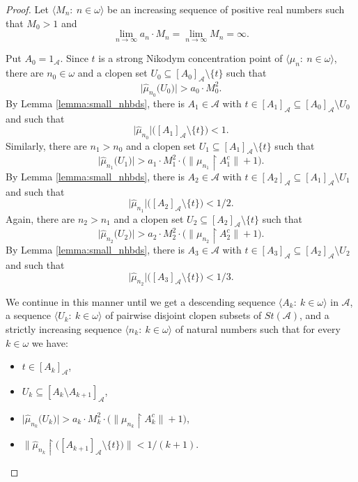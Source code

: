 \documentclass[10pt,a4paper]{amsart}
\newcommand{\N}{\mathbb{N}}
\newcommand{\aA}{\mathcal{A}}
\newcommand{\clopen}[1]{\left[#1\right]}
\newcommand{\io}{\in\omega}%
\newcommand{\rstr}{\restriction}
\newcommand{\seqk}[1]{\big\langle#1\colon\ k\io\big\rangle}
\newcommand{\seqn}[1]{\big\langle#1\colon\ n\io\big\rangle}
\newcommand{\sm}{\setminus}
\newcommand{\sub}{\subseteq}
\newcommand{\wh}{\widehat}
\begin{document}
\begin{proof}
Let $\seqn{M_n}$ be an increasing sequence of positive real numbers such that $M_0>1$ and
\[\tag{$*$}\lim_{n\to\infty}a_n\cdot M_n=\lim_{n\to\infty}M_n=\infty.\]

Put $A_0=1_\aA$. Since $t$ is a strong Nikodym concentration point of $\seqn{\mu_n}$, there are $n_0\io$ and a clopen set $U_0\sub\clopen{A_0}_\aA\sm\{t\}$ such that
\[\big|\wh{\mu}_{n_0}\big(U_0\big)\big|>a_0\cdot M_0^2.\]
By Lemma \ref{lemma:small_nhbds}, there is $A_1\in\aA$ with $t\in\clopen{A_1}_\aA\sub\clopen{A_0}_\aA\sm U_0$ and such that
\[\big|\wh{\mu}_{n_0}\big|\big(\clopen{A_1}_\aA\sm\{t\}\big)<1.\]
Similarly, there are $n_1>n_0$ and a clopen set $U_1\sub\clopen{A_1}_\aA\sm\{t\}$ such that
\[\big|\wh{\mu}_{n_1}\big(U_1\big)\big|>a_1\cdot M_1^2\cdot\Big(\big\|\mu_{n_1}\rstr A_1^c\big\|+1\Big).\]
By Lemma \ref{lemma:small_nhbds}, there is $A_2\in\aA$ with $t\in\clopen{A_2}_\aA\sub\clopen{A_1}_\aA\sm U_1$ and such that
\[\big|\wh{\mu}_{n_1}\big|\big(\clopen{A_2}_\aA\sm\{t\}\big)<1/2.\]
Again, there are $n_2>n_1$ and a clopen set $U_2\sub\clopen{A_2}_\aA\sm\{t\}$ such that
\[\big|\wh{\mu}_{n_2}\big(U_2\big)\big|>a_2\cdot M_2^2\cdot\Big(\big\|\mu_{n_2}\rstr A_2^c\big\|+1\Big).\]
By Lemma \ref{lemma:small_nhbds}, there is $A_3\in\aA$ with $t\in\clopen{A_3}_\aA\sub\clopen{A_2}_\aA\sm U_2$ and such that
\[\big|\wh{\mu}_{n_2}\big|\big(\clopen{A_3}_\aA\sm\{t\}\big)<1/3.\]

We continue in this manner until we get a descending sequence $\seqk{A_k}$ in $\aA$, a sequence $\seqk{U_k}$ of pairwise disjoint clopen subsets of $St(\aA)$, and a strictly increasing sequence $\seqk{n_k}$ of natural numbers such that for every $k\io$ we have:
\begin{itemize}
	\item $t\in\clopen{A_k}_\aA$,
	\item $U_k\sub\clopen{A_k\sm A_{k+1}}_\aA$,
	\item $\big|\wh{\mu}_{n_k}\big(U_k\big)\big|>a_k\cdot M_k^2\cdot\Big(\big\|\mu_{n_k}\rstr A_k^c\big\|+1\Big)$,
	\item $\big\|\wh{\mu}_{n_k}\rstr\big(\clopen{A_{k+1}}_\aA\sm\{t\}\big)\big\|<1/(k+1)$.
\end{itemize}


\end{proof}
\end{document}
